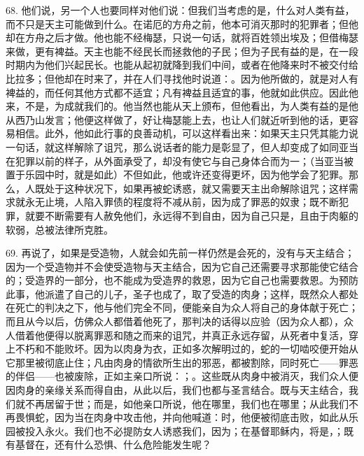 68. 他们说，另一个人也要同样对他们说：但我们当考虑的是，什么对人类有益，而不只是天主可能做到什么。在诺厄的方舟之前，他本可消灭那时的犯罪者；但他却在方舟之后才做。他也能不经梅瑟，只说一句话，就将百姓领出埃及；但借梅瑟来做，更有裨益。天主也能不经民长而拯救他的子民；但为子民有益的是，在一段时期内为他们兴起民长。也能从起初就降到我们中间，或者在他降来时不被交付给比拉多；但他却在时来了，并在人们寻找他时说道：。因为他所做的，就是对人有裨益的，而任何其他方式都不适宜；凡有裨益且适宜的事，他就如此供应。因此他来，不是，为成就我们的。他当然也能从天上颁布，但他看出，为人类有益的是他从西乃山发言；他便这样做了，好让梅瑟能上去，也让人们就近听到他的话，更容易相信。此外，他如此行事的良善动机，可以这样看出来：如果天主只凭其能力说一句话，就这样解除了诅咒，那么说话者的能力是彰显了，但人却变成了如同亚当在犯罪以前的样子，从外面承受了，却没有使它与自己身体合而为一；（当亚当被置于乐园中时，就是如此）不但如此，他或许还变得更坏，因为他学会了犯罪。那么，人既处于这种状况下，如果再被蛇诱惑，就又需要天主出命解除诅咒；这样需求就永无止境，人陷入罪债的程度将不减从前，因为成了罪恶的奴隶；既不断犯罪，就要不断需要有人赦免他们，永远得不到自由，因为自己只是，且由于肉躯的软弱，总被法律所克胜。\par

69. 再说了，如果是受造物，人就会如先前一样仍然是会死的，没有与天主结合；因为一个受造物并不会使受造物与天主结合，因为它自己还需要寻求那能使它结合的；受造界的一部分，也不能成为受造界的救恩，因为它自己也需要救恩。为预防此事，他派遣了自己的儿子，圣子也成了，取了受造的肉身；这样，既然众人都处在死亡的判决之下，他与他们完全不同，便能亲自为众人将自己的身体献于死亡；而且从今以后，仿佛众人都借着他死了，那判决的话得以应验（因为众人都），众人借着他便得以脱离罪恶和随之而来的诅咒，并真正永远存留，从死者中复活，穿上不朽和不能败坏。因为以肉身为衣，正如多次解明过的，蛇的一切啮咬便开始从它那里被彻底止住；凡由肉身的情欲所生出的邪恶，都被割除，同时死亡——罪恶的伴侣——也被废除，正如主亲口所说：；。这些既从肉身中被消灭，我们众人便因肉身的亲缘关系而得自由，从此以后，我们也都与圣言结合。既与天主结合，我们就不再居留于世；而是，如他亲口所说，他在哪里，我们也在哪里；从此我们不再畏惧蛇，因为当在肉身中攻击他，并向他喊道：时，他便被彻底击败，如此从乐园被投入永火。我们也不必提防女人诱惑我们，因为；在基督耶稣内，将是，；既有基督在，还有什么恐惧、什么危险能发生呢？\par

